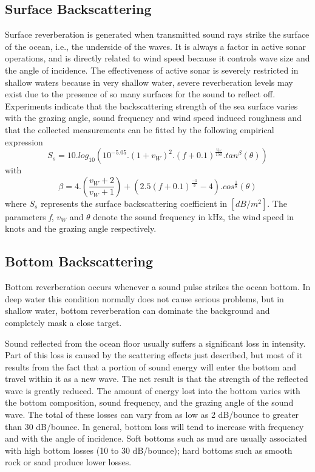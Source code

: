 \subsection{ Surface Backscattering } \label{ Surface Backscattering } 
\noindent Surface reverberation is generated when transmitted sound rays strike the surface of the ocean, i.e., the underside of the waves. It is always a factor in active sonar operations, and is directly related to wind speed because it controls wave size and the angle of incidence. The effectiveness of active sonar is severely restricted in shallow waters because in very shallow water, severe reverberation levels may exist due to the presence of so many surfaces for the sound to reflect off. Experiments indicate that the backscattering strength of the sea surface varies with the grazing angle, sound frequency and wind speed induced roughness and that the collected measurements can be fitted by the following empirical expression
\[ {S_s}  = 10 . log_{10}( 10^{-5.05}  . ( 1 + {v_W} )^2 . ( \textit{f} + 0.1 )^{\frac{v_W}{150}} . tan^{\beta}(\theta)) \] 
\noindent with
\[ \beta  = 4 . (\frac{v_W + 2}{v_W + 1}) + ( 2.5 ( f + 0.1 )^{\frac{-1}{3}} - 4 ) . cos^{\frac{1}{8}}(\theta)\] 
\noindent where $ {S_s} $ represents the surface backscattering coefficient in $ [dB/m^2] $. The parameters \textit{f}, ${v_W}$  and  $\theta$ denote the sound frequency in kHz, the wind speed in knots and the grazing angle respectively. 

\subsection{ Bottom Backscattering } \label{ Bottom Backscattering } 
\noindent Bottom reverberation occurs whenever a sound pulse strikes the ocean bottom. In deep water this condition normally does not cause serious problems, but in shallow water, bottom reverberation can dominate the background and completely mask a close target. 

\noindent Sound reflected from the ocean floor usually suffers a significant loss in intensity. Part of this loss is caused by the scattering effects just described, but most of it results from the fact that a portion of sound energy will enter the bottom and travel within it as a new wave. The net result is that the strength of the reflected wave is greatly reduced. The amount of energy lost into the bottom varies with the bottom composition, sound frequency, and the grazing angle of the sound wave. The total of these losses can vary from as low as 2 dB/bounce to greater than 30 dB/bounce. In general, bottom loss will tend to increase with frequency and with the angle of incidence. Soft bottoms such as mud are usually associated with high bottom losses (10 to 30 dB/bounce); hard bottoms such as smooth rock or sand produce lower losses.

